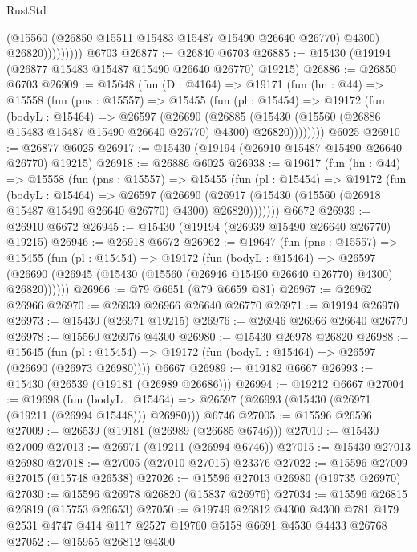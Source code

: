 \begin{lexlean}{RustStd}
\begin{coremodule}
                      (@15560 (@26850 @15511 @15483 @15487 @15490 @26640 @26770) @4300)
                      @26820)))))))))
    @6703
@26877 := @26840 @6703
@26885 := @15430 (@19194 (@26877 @15483 @15487 @15490 @26640 @26770) @19215)
@26886 := @26850 @6703
@26909 := @15648
    (fun (D : @4164) =>
    @19171
      (fun (hn : @44) =>
      @15558
        (fun (pns : @15557) =>
        @15455
          (fun (pl : @15454) =>
          @19172
            (fun (bodyL : @15464) =>
            @26597
              (@26690
                (@26885
                  (@15430 (@15560 (@26886 @15483 @15487 @15490 @26640 @26770) @4300) @26820))))))))
    @6025
@26910 := @26877 @6025
@26917 := @15430 (@19194 (@26910 @15487 @15490 @26640 @26770) @19215)
@26918 := @26886 @6025
@26938 := @19617
    (fun (hn : @44) =>
    @15558
      (fun (pns : @15557) =>
      @15455
        (fun (pl : @15454) =>
        @19172
          (fun (bodyL : @15464) =>
          @26597
            (@26690
              (@26917 (@15430 (@15560 (@26918 @15487 @15490 @26640 @26770) @4300) @26820)))))))
    @6672
@26939 := @26910 @6672
@26945 := @15430 (@19194 (@26939 @15490 @26640 @26770) @19215)
@26946 := @26918 @6672
@26962 := @19647
    (fun (pns : @15557) =>
    @15455
      (fun (pl : @15454) =>
      @19172
        (fun (bodyL : @15464) =>
        @26597 (@26690 (@26945 (@15430 (@15560 (@26946 @15490 @26640 @26770) @4300) @26820))))))
@26966 := @79 @6651 (@79 @6659 @81)
@26967 := @26962 @26966
@26970 := @26939 @26966 @26640 @26770
@26971 := @19194 @26970
@26973 := @15430 (@26971 @19215)
@26976 := @26946 @26966 @26640 @26770
@26978 := @15560 @26976 @4300
@26980 := @15430 @26978 @26820
@26988 := @15645
    (fun (pl : @15454) => @19172 (fun (bodyL : @15464) => @26597 (@26690 (@26973 @26980))))
    @6667
@26989 := @19182 @6667
@26993 := @15430 (@26539 (@19181 (@26989 @26686)))
@26994 := @19212 @6667
@27004 := @19698
    (fun (bodyL : @15464) => @26597 (@26993 (@15430 (@26971 (@19211 (@26994 @15448))) @26980)))
    @6746
@27005 := @15596 @26596
@27009 := @26539 (@19181 (@26989 (@26685 @6746)))
@27010 := @15430 @27009
@27013 := @26971 (@19211 (@26994 @6746))
@27015 := @15430 @27013 @26980
@27018 := @27005 (@27010 @27015) @23376
@27022 := @15596 @27009 @27015 (@15748 @26538)
@27026 := @15596 @27013 @26980 (@19735 @26970)
@27030 := @15596 @26978 @26820 (@15837 @26976)
@27034 := @15596 @26815 @26819 (@15753 @26653)
@27050 := @19749
    @26812
    @4300
    @4300
    @781
    @179
    @2531
    @4747
    @414
    @117
    @2527
    @19760
    @5158
    @6691
    @4530
    @4433
    @26768
@27052 := @15955 @26812 @4300

\end{coremodule}
\end{lexlean}
